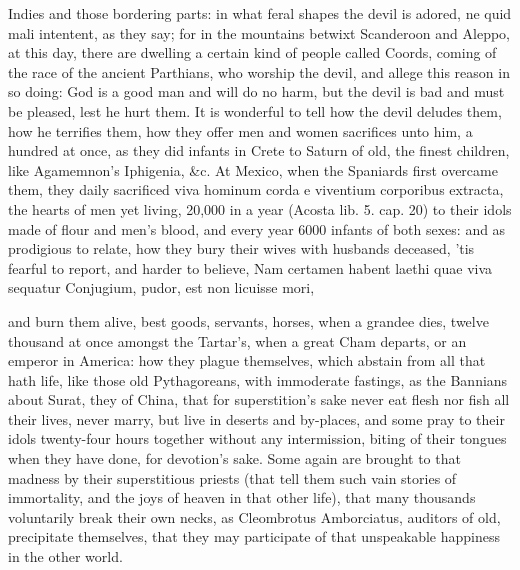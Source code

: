 {Indies and those bordering parts: in what feral shapes the
devil is adored, ne quid mali intentent, as they say; for in the
mountains betwixt Scanderoon and Aleppo, at this day, there are
dwelling a certain kind of people called Coords, coming of the race of
the ancient Parthians, who worship the devil, and allege this reason in
so doing: God is a good man and will do no harm, but the devil is bad
and must be pleased, lest he hurt them. It is wonderful to tell how the
devil deludes them, how he terrifies them, how they offer men and women
sacrifices unto him, a hundred at once, as they did infants in Crete to
Saturn of old, the finest children, like Agamemnon's Iphigenia, \&c. At
Mexico, when the Spaniards first overcame them, they daily
sacrificed viva hominum corda e viventium corporibus extracta, the
hearts of men yet living, 20,000 in a year (Acosta lib. 5. cap. 20) to
their idols made of flour and men's blood, and every year 6000 infants
of both sexes: and as prodigious to relate, how they bury their
wives with husbands deceased, 'tis fearful to report, and harder to
believe,
Nam certamen habent laethi quae viva sequatur
Conjugium, pudor, est non licuisse mori,

and burn them alive, best goods, servants, horses, when a grandee dies,
twelve thousand at once amongst the Tartar's, when a great Cham
departs, or an emperor in America: how they plague themselves, which
abstain from all that hath life, like those old Pythagoreans, with
immoderate fastings, as the Bannians about Surat, they of China,
that for superstition's sake never eat flesh nor fish all their lives,
never marry, but live in deserts and by-places, and some pray to their
idols twenty-four hours together without any intermission, biting of
their tongues when they have done, for devotion's sake. Some again are
brought to that madness by their superstitious priests (that tell them
such vain stories of immortality, and the joys of heaven in that other
life),  that many thousands voluntarily break their own necks, as
Cleombrotus Amborciatus, auditors of old, precipitate themselves, that
they may participate of that unspeakable happiness in the other world.

}
